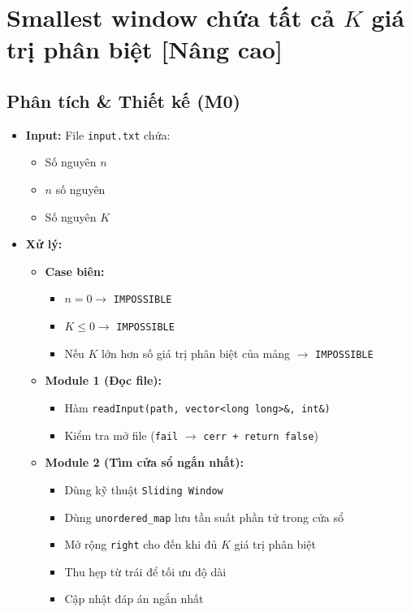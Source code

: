 \section{Smallest window chứa tất cả $K$ giá trị phân biệt [Nâng cao]}
\subsection{Phân tích \& Thiết kế (M0)}
\begin{itemize}
    \item \textbf{Input:}
    File \texttt{input.txt} chứa:
    \begin{itemize}
        \item Số nguyên $n$
        \item $n$ số nguyên
        \item Số nguyên $K$
    \end{itemize}

    \item \textbf{Xử lý:}
    \begin{itemize}
        \item \textbf{Case biên:}
        \begin{itemize}
            \item $n = 0 \rightarrow$ \texttt{IMPOSSIBLE}
            \item $K \leq 0 \rightarrow$ \texttt{IMPOSSIBLE}
            \item Nếu $K$ lớn hơn số giá trị phân biệt của mảng $\rightarrow$ \texttt{IMPOSSIBLE}
        \end{itemize}

        \item \textbf{Module 1 (Đọc file):}
        \begin{itemize}
            \item Hàm \texttt{readInput(path, vector<long long>\&, int\&)}
            \item Kiểm tra mở file (\texttt{fail} $\rightarrow$ \texttt{cerr + return false})
        \end{itemize}

        \item \textbf{Module 2 (Tìm cửa sổ ngắn nhất):}
        \begin{itemize}
            \item Dùng kỹ thuật \texttt{Sliding Window}
            \item Dùng \texttt{unordered\_map} lưu tần suất phần tử trong cửa sổ
            \item Mở rộng \texttt{right} cho đến khi đủ $K$ giá trị phân biệt
            \item Thu hẹp từ trái để tối ưu độ dài
            \item Cập nhật đáp án ngắn nhất
        \end{itemize}


\end{itemize}
\end{itemize}
